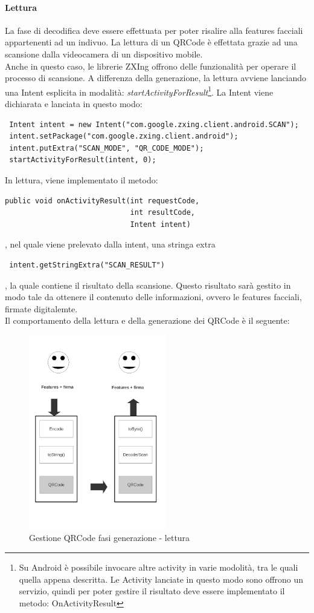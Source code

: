 \paragraph{Lettura}
La fase di decodifica deve essere effettuata per poter risalire alla features facciali appartenenti ad un indivuo.
La lettura di un QRCode è effettata grazie ad una scansione dalla videocamera di un dispositivo mobile.\\
Anche in questo caso, le librerie ZXIng offrono delle funzionalità per operare il processo di scansione.
A differenza della generazione, la lettura avviene lanciando una Intent esplicita in modalità: \textit{startActivityForResult}\footnote{Su Android è possibile invocare altre activity in varie modolità, tra le quali quella appena descritta. Le Activity lanciate in questo modo sono offrono un servizio, quindi per poter gestire il risultato deve essere implementato il metodo: OnActivityResult}.
La Intent viene dichiarata e lanciata in questo modo:
\begin{verbatim}
 Intent intent = new Intent("com.google.zxing.client.android.SCAN");
 intent.setPackage("com.google.zxing.client.android");
 intent.putExtra("SCAN_MODE", "QR_CODE_MODE");
 startActivityForResult(intent, 0);
\end{verbatim}
In lettura, viene implementato il metodo:
\begin{verbatim} 
public void onActivityResult(int requestCode, 
                             int resultCode, 
                             Intent intent)
\end{verbatim}, nel quale viene prelevato dalla intent, una stringa extra \begin{verbatim} intent.getStringExtra("SCAN_RESULT")
\end{verbatim}, la quale contiene il risultato della scansione.
Questo risultato sarà gestito in modo tale da ottenere il contenuto delle informazioni, ovvero le features facciali, firmate digitalemte.
\\
Il comportamento della lettura e della generazione dei QRCode è il seguente:
\begin{figure}[htbp]
   \centering
   \includegraphics[width=6cm]{img/processo}
   \caption{Gestione QRCode fasi generazione - lettura\label{qrgen}}
\end{figure}
